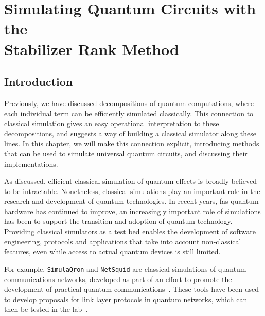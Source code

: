 
\chapter[Simulating Quantum Circuits with Stabilizer Rank]{Simulating Quantum Circuits with the\\ Stabilizer Rank Method}\label{chap:simulator}
\section{Introduction}\label{sec:simulator_intro}
Previously, we have discussed decompositions of quantum computations, where each individual term can be efficiently simulated classically. This connection to classical simulation gives an easy operational interpretation to these decompositions, and suggests a way of building a classical simulator along these lines. In this chapter, we will make this connection explicit, introducing methods that can be used to simulate universal quantum circuits, and discussing their implementations.\par
As discussed, efficient classical simulation of quantum effects is broadly believed to be intractable. Nonetheless, classical simulations play an important role in the research and development of quantum technologies. In recent years, fas quantum hardware has continued to improve, an increasingly important role of simulations has been to support the transition and adoption of quantum technology. Providing classical simulators as a test bed enables the development of software engineering, protocols and applications that take into account non-classical features, even while access to actual quantum devices is still limited. \par
For example, \texttt{SimulaQron} and \texttt{NetSquid} are classical simulations of quantum communications networks, developed as part of an effort to promote the development of practical quantum communications~\cite{Dahlberg2017,NetSquid}. These tools have been used to develop proposals for link layer protocols in quantum networks, which can then be tested in the lab~\cite{Dahlberg2019}.\par
